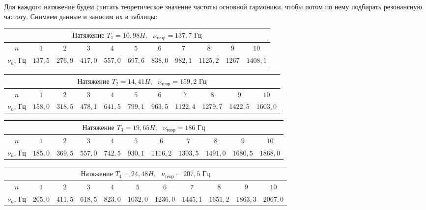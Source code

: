 \documentclass[a4paper,12pt]{article} %
\begin{document}
Для каждого натяжение будем считать теоретическое значение частоты основной гармоники, чтобы потом по нему подбирать резонансную частоту. Снимаем данные и заносим их в таблицы:


\begin{center}
\begin{tabular}{|c|c|c|c|c|c|c|c|c|c|c|}
\hline 
\multicolumn{11}{|c|}{$\textbf{Натяжение } T_1 = 10,98H, \text{ } \nu_{\text{теор}} = 137,7 \text{ Гц}$} \\ 
\hline 
$n$ & $1$ & $2$ & $3$ & $4$ & $5$ & $6$ & $7$ & $8$ & $9$ & $10$ \\ 
\hline 
$\nu_n$, Гц & $137,5$ & $276,9$ & $417,0$ & $557,0$ & $697,6$ & $838,0$ & $982,1$ & $1125,2$ & $1267$& $1408,1$\\
\hline
\end{tabular} 
\end{center}

\begin{center}
\begin{tabular}{|c|c|c|c|c|c|c|c|c|c|c|}
\hline 
\multicolumn{11}{|c|}{$\textbf{Натяжение } T_2 = 14,41H, \text{ } \nu_{\text{теор}} = 159,2 \text{ Гц}$} \\ 
\hline 
$n$ & $1$ & $2$ & $3$ & $4$ & $5$ & $6$ & $7$ & $8$ & $9$ & $10$ \\ 
\hline 
$\nu_n$, Гц & $158,0$ & $318,5$ & $478,1$ & $641,5$ & $799,1$ & $963,5$ & $1122,4$ & $1279,7$ & $1422,5$& $1603,0$\\
\hline
\end{tabular} 
\end{center}

\begin{center}
\begin{tabular}{|c|c|c|c|c|c|c|c|c|c|c|}
\hline 
\multicolumn{11}{|c|}{$\textbf{Натяжение } T_3 = 19,65H, \text{ } \nu_{\text{теор}} = 186 \text{ Гц}$} \\ 
\hline 
$n$ & $1$ & $2$ & $3$ & $4$ & $5$ & $6$ & $7$ & $8$ & $9$ & $10$ \\ 
\hline 
$\nu_n$, Гц & $185,0$ & $369,5$ & $557,0$ & $742,5$ & $930,1$ & $1116,2$ & $1303,5$ & $1491,0$ & $1680,5$& $1868,0$\\
\hline
\end{tabular} 
\end{center}

\begin{center}
\begin{tabular}{|c|c|c|c|c|c|c|c|c|c|c|}
\hline 
\multicolumn{11}{|c|}{$\textbf{Натяжение } T_4 = 24,48H, \text{ } \nu_{\text{теор}} = 207,5 \text{ Гц}$} \\ 
\hline 
$n$ & $1$ & $2$ & $3$ & $4$ & $5$ & $6$ & $7$ & $8$ & $9$ & $10$ \\ 
\hline 
$\nu_n$, Гц & $205,0$ & $411,5$ & $618,5$ & $823,0$ & $1032,0$ & $1236,0$ & $1445,1$ & $1651,2$ & $1863,3$& $2067,0$\\
\hline
\end{tabular} 
\end{center}
\end{document}
